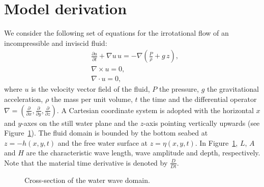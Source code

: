 \section{Model derivation}\label{sec:lopes:modelderivation}
We consider the following set of equations for the
irrotational flow of an incompressible and inviscid fluid:
\begin{subequations}\label{eq:lopes:euler}
\begin{align}
&\displaystyle\frac{\partial u}{\partial t}+\nabla u \,
  u=-\nabla\left(\frac{P}{\rho} +g\,
  z\right),\label{eq:lopes:euler-a} \\ &\nabla\times
  u={0},\label{eq:lopes:euler-b}
  \\ &\nabla\cdot{u}=0,\label{eq:lopes:euler-c}
\end{align}
\end{subequations}
where $u$ is the velocity vector field of the fluid, $P$ the
pressure, $g$ the gravitational acceleration, $\rho$ the
mass per unit volume, $t$ the time and the differential
operator
$\nabla=\left(\frac{\partial }{\partial x},\frac{\partial
}{\partial y},\frac{\partial }{\partial z}\right).$ A
Cartesian coordinate system is adopted with the horizontal
$x$ and $y$-axes on the still water plane and the $z$-axis
pointing vertically upwards (see
Figure~\ref{fig:lopes:schematic}).  The fluid domain is
bounded by the bottom seabed at $z=-h(x,y,t)$ and the free
water surface at $z=\eta(x,y,t)$.
In Figure~\ref{fig:lopes:schematic}, $L$, $A$ and $H$ are the
characteristic wave length, wave amplitude and depth,
respectively. Note that the material time derivative is
denoted by $\frac{D}{D t}$.
\begin{figure}
\begin{center}
\end{center}
\caption{Cross-section of the water wave domain.}
\label{fig:lopes:schematic}
\end{figure}

